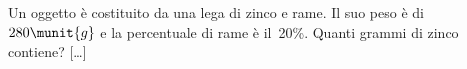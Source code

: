 \begin{htmulticols}{2}
% 
% 
% 

\begin{esercizio}
\label{ese:3.179}
 Un oggetto è costituito da una lega di zinco e rame. Il suo peso
è di~\(280\munit{g}\) e la percentuale di rame è il~20\%. Quanti grammi di 
zinco
contiene? \hfill [\dots]
\end{esercizio}

% 
% 


\end{htmulticols}
